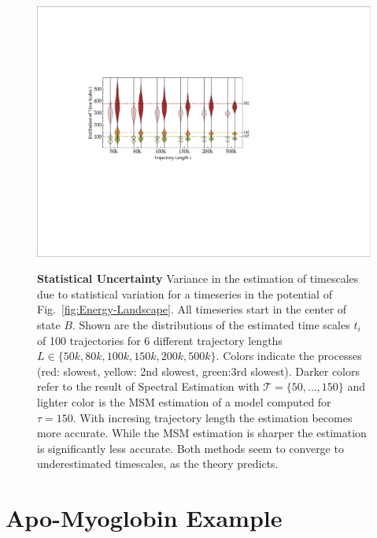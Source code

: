 \documentclass[aps,pre,twocolumn,nofootinbib,superscriptaddress,linenumbers]{revtex4-1}
\begin{document}
\begin{figure}
\begin{centering}
\includegraphics[width=1\columnwidth]{figures/StatisticsEstimation}
\par\end{centering}

\centering{}\label{fig:StatisticalUncertainty}\textbf{Statistical Uncertainty}
Variance in the estimation of timescales due to statistical variation
for a timeseries in the potential of Fig.~\ref{fig:Energy-Landscape}.
All timeseries start in the center of state $B$. Shown are the distributions
of the estimated time scales $t_{i}$ of 100 trajectories for 6 different
trajectory lengths $L\in\{50k,80k,100k,150k,200k,500k\}$. Colors
indicate the processes (red: slowest, yellow: 2nd slowest, green:3rd
slowest). Darker colors refer to the result of Spectral Estimation
with $\mathcal{T}=\{50,\ldots,150\}$ and lighter color is the MSM
estimation of a model computed for $\tau=150$. With incresing trajectory
length the estimation becomes more accurate. While the MSM estimation
is sharper the estimation is significantly less accurate. Both methods
seem to converge to underestimated timescales, as the theory predicts.
\end{figure}


\section{Apo-Myoglobin Example}
\end{document}

